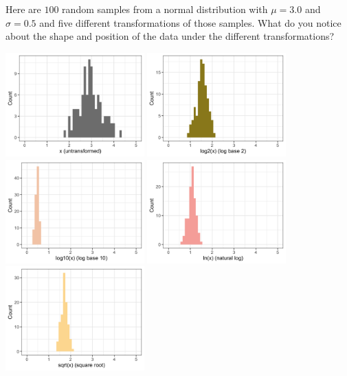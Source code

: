 \begin{question}{}
Here are $100$ random samples from a normal distribution with $\mu = 3.0$ and $\sigma = 0.5$ and five different transformations of those samples. What do you notice about the shape and position of the data under the different transformations?
\begin{center}
\includegraphics[width=0.4\textwidth]{img/normal-transform-0.png}
\includegraphics[width=0.4\textwidth]{img/normal-transform-1.png}
\includegraphics[width=0.4\textwidth]{img/normal-transform-2.png}
\includegraphics[width=0.4\textwidth]{img/normal-transform-3.png}
\includegraphics[width=0.4\textwidth]{img/normal-transform-4.png}

\end{center}
\end{question}
